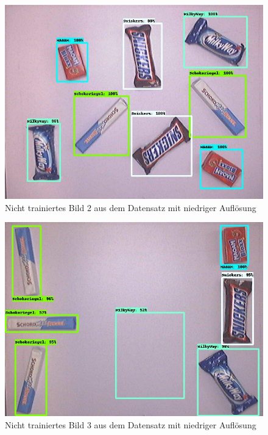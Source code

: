     \begin{figure}[H]
        \centering
        \includegraphics[angle = 90, width = \textwidth]{Bilder/models/model_comparison/ssd_resnet101_v1_fpn_640x640_coco17_tpu-8/non_trained_2.jpg}
        \caption{Nicht trainiertes Bild 2 aus dem Datensatz mit niedriger Auflösung}
    \end{figure}
    
    \begin{figure}[H]
        \centering
        \includegraphics[angle = 90, width = \textwidth]{Bilder/models/model_comparison/ssd_resnet101_v1_fpn_640x640_coco17_tpu-8/non_trained_3.jpg}
        \caption{Nicht trainiertes Bild 3 aus dem Datensatz mit niedriger Auflösung}
    \end{figure}
    
